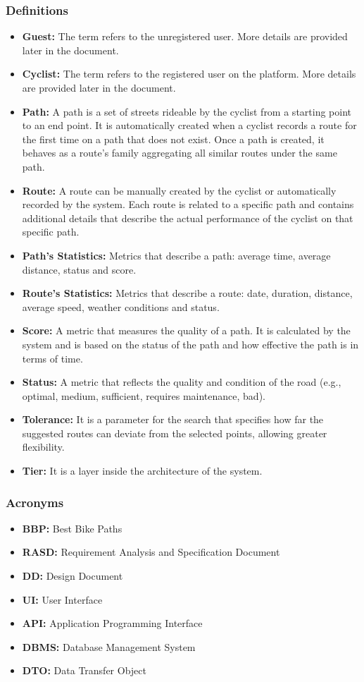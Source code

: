 \subsubsection{Definitions}
\begin{itemize}
    \item \textbf{Guest:} The term refers to the unregistered user. More details are provided later in the document.
    \item \textbf{Cyclist:} The term refers to the registered user on the platform. More details are provided later in the document.
    \item \textbf{Path:} A path is a set of streets rideable by the cyclist from a starting point to an end point. It is automatically created when a cyclist records a route for the first time on a path that does not exist. Once a path is created, it behaves as a route's family aggregating all similar routes under the same path.
    \item \textbf{Route:} A route can be manually created by the cyclist or automatically recorded by the system. Each route is related to a specific path and contains additional details that describe the actual performance of the cyclist on that specific path.
    \item \textbf{Path's Statistics:} Metrics that describe a path: average time, average distance, status and score.
    \item \textbf{Route's Statistics:} Metrics that describe a route: date, duration, distance, average speed, weather conditions and status.
    \item \textbf{Score:} A metric that measures the quality of a path. It is calculated by the system and is based on the status of the path and how effective the path is in terms of time. 
    \item \textbf{Status:} A metric that reflects the quality and condition of the road (e.g., optimal, medium, sufficient, requires maintenance, bad).
    \item \textbf{Tolerance:} It is a parameter for the search that specifies how far the suggested routes can deviate from the selected points, allowing greater flexibility.
    \item \textbf{Tier:} It is a layer inside the architecture of the system.
\end{itemize}
\subsubsection{Acronyms}
\begin{itemize}
    \item \textbf{BBP:} Best Bike Paths
    \item \textbf{RASD:} Requirement Analysis and Specification Document
    \item \textbf{DD:} Design Document
    \item \textbf{UI:} User Interface
    \item \textbf{API:} Application Programming Interface
    \item \textbf{DBMS:} Database Management System
    \item \textbf{DTO:} Data Transfer Object
\end{itemize}
